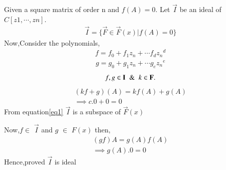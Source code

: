 Given a square matrix of order n and $f(A)=0$.
Let $\vec{I}$ be an ideal of $C[z 1 , \cdots , z n ]$. 
\begin{align}
 \vec{I}=\{\vec{F}\in \vec{F}(x)|f(A)=0\}
\end{align}
Now,Consider the polynomials,
\begin{align}
f = f_0 + f_1{z_n} + \cdots f_d {z_n}^ d 
\end{align}
\begin{align}
g = g_0 + g_ 1 {z_n} + \cdots g_e {z_ n }^e
\end{align}
\begin{align}
f,g \in \vec{I} \And k \in \vec{F}.\nonumber
\end{align}
\begin{align}
(kf+g)(A)=kf(A)+g(A)\\
\implies c.0+0=0\label{eq1}
\end{align}
From equation\eqref{eq1} $\vec{I}$ is a subspace of $\vec{F}(x)$

Now,$f$$\in$ $\vec{I}$ and $g$ $\in$ $F(x)$ then,
\begin{align}
(gf)A=g(A)f(A)\\
\implies g(A).0=0
\end{align}
Hence,proved $\vec{I}$ is ideal

   
   

